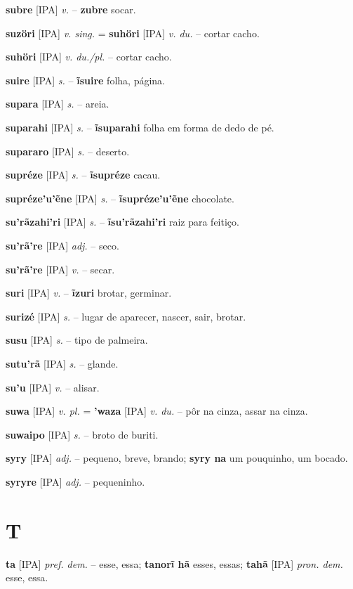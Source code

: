 \textbf{subre} [IPA] \textit{v.} -- \textbf{zubre} socar.

\textbf{suzöri} [IPA] \textit{v. sing.} = \textbf{suhöri} [IPA] \textit{v. du.} -- cortar cacho.

\textbf{suhöri} [IPA] \textit{v. du./pl.} -- cortar cacho.

\textbf{suire} [IPA] \textit{s.} -- \textbf{ĩsuire} folha, página.

\textbf{supara} [IPA] \textit{s.} -- areia.

\textbf{suparahi} [IPA] \textit{s.} -- \textbf{ĩsuparahi} folha em forma de dedo de pé.

\textbf{supararo} [IPA] \textit{s.} -- deserto.

\textbf{supréze} [IPA] \textit{s.} -- \textbf{ĩsupréze} cacau.

\textbf{supréze'u'ẽne} [IPA] \textit{s.} -- \textbf{ĩsupréze'u'ẽne} chocolate.

\textbf{su'rãzahi'ri} [IPA] \textit{s.} -- \textbf{ĩsu'rãzahi'ri} raiz para feitiço.

\textbf{su'rã're} [IPA] \textit{adj.} -- seco.

\textbf{su'rã're} [IPA] \textit{v.} -- secar.

\textbf{suri} [IPA] \textit{v.} -- \textbf{ĩzuri} brotar, germinar.

\textbf{surizé} [IPA] \textit{s.} -- lugar de aparecer, nascer, sair, brotar.

\textbf{susu} [IPA] \textit{s.} -- tipo de palmeira.

\textbf{sutu'rã} [IPA] \textit{s.} -- glande.

\textbf{su'u} [IPA] \textit{v.} -- alisar.

\textbf{suwa} [IPA] \textit{v. pl.} = \textbf{'waza} [IPA] \textit{v. du.} -- pôr na cinza, assar na cinza.

\textbf{suwaipo} [IPA] \textit{s.} -- broto de buriti.

\textbf{syry} [IPA] \textit{adj.} -- pequeno, breve, brando; \textbf{syry na} um pouquinho, um bocado.

\textbf{syryre} [IPA] \textit{adj.} --  pequeninho.


\section*{T}



\textbf{ta} [IPA] \textit{pref. dem.} -- esse, essa; \textbf{tanorĩ hã} esses, essas; \textbf{tahã} [IPA] \textit{pron. dem.} esse, essa.

